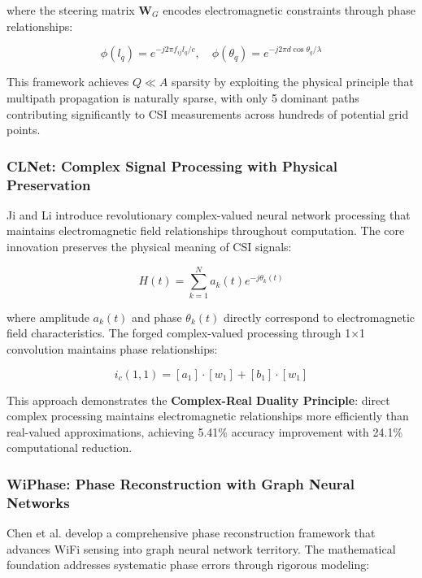 \documentclass[journal]{IEEEtran}
\begin{document}
where the steering matrix $\mathbf{W}_G$ encodes electromagnetic constraints through phase relationships:

\begin{equation}
\phi(l_q) = e^{-j2\pi f_{ij} l_q / c}, \quad \phi(\theta_q) = e^{-j2\pi d \cos\theta_q / \lambda}
\label{eq:wihgr_phase_constraints}
\end{equation}

This framework achieves $Q \ll A$ sparsity by exploiting the physical principle that multipath propagation is naturally sparse, with only 5 dominant paths contributing significantly to CSI measurements across hundreds of potential grid points.

\subsubsection{CLNet: Complex Signal Processing with Physical Preservation}

Ji and Li \cite{ji2021clnet} introduce revolutionary complex-valued neural network processing that maintains electromagnetic field relationships throughout computation. The core innovation preserves the physical meaning of CSI signals:

\begin{equation}
H(t) = \sum_{k=1}^{N} a_k(t)e^{-j\theta_k(t)}
\label{eq:clnet_complex_csi}
\end{equation}

where amplitude $a_k(t)$ and phase $\theta_k(t)$ directly correspond to electromagnetic field characteristics. The forged complex-valued processing through 1×1 convolution maintains phase relationships:

\begin{equation}
i_c(1,1) = [a_1] \cdot [w_1] + [b_1] \cdot [w_1]
\label{eq:clnet_complex_processing}
\end{equation}

This approach demonstrates the \textbf{Complex-Real Duality Principle}: direct complex processing maintains electromagnetic relationships more efficiently than real-valued approximations, achieving 5.41\% accuracy improvement with 24.1\% computational reduction.

\subsubsection{WiPhase: Phase Reconstruction with Graph Neural Networks}

Chen et al. \cite{chen2024wiphase} develop a comprehensive phase reconstruction framework that advances WiFi sensing into graph neural network territory. The mathematical foundation addresses systematic phase errors through rigorous modeling:
\end{document}
